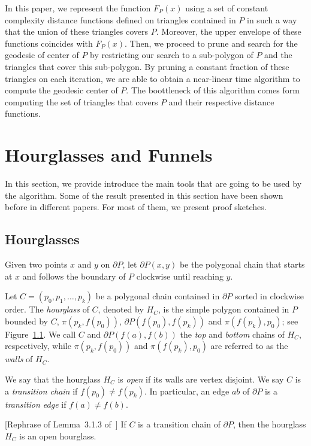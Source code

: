 \documentclass[a4paper,UKenglish]{lipics}
\newcommand{\F}[2]{\ensuremath{F_{\scriptscriptstyle #1}(#2)}}
\newcommand{\ff}[1]{\ensuremath{f(#1)}}
\newcommand{\p}[2]{\ensuremath{\pi(#1, #2)}}
\begin{document}
In this paper, we represent the function $\F{P}{x}$ using a set of constant complexity distance functions defined on triangles contained in $P$ in such a way that the union of these triangles covers $P$. Moreover, the upper envelope of these functions coincides with $\F{P}{x}$.
Then, we proceed to prune and search for the geodesic of center of $P$ by restricting our search to a sub-polygon of $P$ and the triangles that cover this sub-polygon. By pruning a constant fraction of these triangles on each iteration, we are able to obtain a near-linear time algorithm to compute the geodesic center of $P$. The boottleneck of this algorithm comes form computing the set of triangles that covers $P$ and their respective distance functions.


\section{Hourglasses and Funnels}
In this section, we provide introduce the main tools that are going to be used by the algorithm. Some of the result presented in this section have been shown before in different papers. For most of them, we present proof sketches.

\subsection{Hourglasses}

Given two points $x$ and $y$ on $\partial P$, let $\partial P(x,y)$ be the polygonal chain that starts at $x$ and follows the boundary of $P$ clockwise until reaching $y$.

Let $C = (p_0, p_1, \ldots, p_k)$ be a polygonal chain contained in $\partial P$ sorted in clockwise order.
The \emph{hourglass} of $C$, denoted by $H_C$, is the simple polygon contained in $P$ bounded by $C$, $\p{p_k}{\ff{p_0}}$, $\partial P(\ff{p_0}, \ff{p_k})$ and $\p{\ff{p_k}}{ p_0}$; see Figure~\ref{}. 
We call $C$ and $\partial P(\ff{a}, \ff{b})$ the \emph{top} and \emph{bottom} chains of $H_C$, respectively, while $\p{p_k}{ \ff{p_0}}$ and $\p{\ff{p_k}}{p_0}$ are referred to as the \emph{walls} of $H_C$.

We say that the hourglass $H_C$ is \emph{open} if its walls are vertex disjoint. 
We say $C$ is a \emph{transition chain} if $\ff{p_0} \neq \ff{p_k}$. In particular, an edge $ab$ of $\partial P$ is a \emph{transition edge} if $\ff{a} \neq \ff{b}$.

\begin{lemma}\label{lemma:Transition hourglasses are open}
[Rephrase of Lemma~3.1.3 of~\cite{aronov1993furthest}] 
If $C$ is a transition chain of $\partial P$, then the hourglass $H_C$ is an open hourglass.
\end{lemma}
\end{document}
